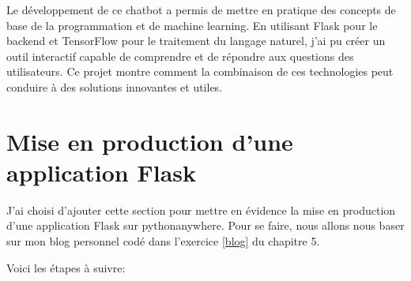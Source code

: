 \documentclass[a4paper,11pt]{article}
\begin{document}
        
        \begin{tcolorbox}[colback=lightgray!6, colframe=black, left=5mm, right=5mm, top=2mm, bottom=2mm, boxrule=0.1mm]
            Le développement de ce chatbot a permis de mettre en pratique des concepts de base de la programmation et de machine learning. 
            En utilisant Flask pour le backend et TensorFlow pour le traitement du langage naturel, j'ai pu créer un outil interactif 
            capable de comprendre et de répondre aux questions des utilisateurs. Ce projet montre comment la combinaison de ces technologies 
            peut conduire à des solutions innovantes et utiles.
        \end{tcolorbox}
    
    \newpage
    \section{Mise en production d'une application Flask}

        \noindent J'ai choisi d'ajouter cette section pour mettre en évidence la mise en 
        production d'une application Flask sur pythonanywhere. Pour se faire, nous allons nous baser 
        sur mon blog personnel codé dans l'exercice \ref{blog} du chapitre 5.

        \bigskip
        \noindent Voici les étapes à suivre:
\end{document}
